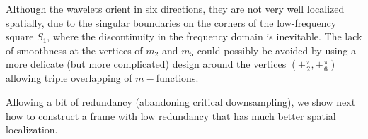 Although the wavelets orient in six directions, they are not very well localized spatially, due to the singular boundaries on the corners of the low-frequency square $S_1$, where the discontinuity in the frequency domain is inevitable. The lack of smoothness at the vertices of $m_2$ and $m_5$ could possibly be avoided by using a more delicate (but more complicated) design around the vertices $(\pm\frac{\pi}{2},\pm\frac{\pi}{6})$ allowing triple overlapping of $m-$functions.%

Allowing a bit of redundancy (abandoning critical downsampling), we show next how to construct a frame with low redundancy that has much better spatial localization.
